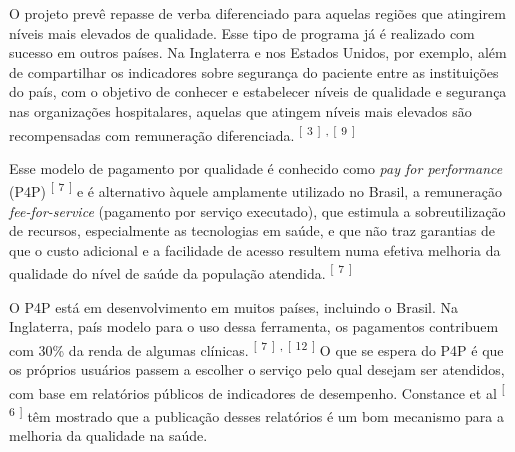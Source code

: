 \documentclass{article}
\begin{document}
O projeto prevê repasse de verba diferenciado para aquelas regiões que atingirem níveis
        mais elevados de qualidade. Esse tipo de programa já é realizado com sucesso em outros
        países. Na Inglaterra e nos Estados Unidos, por exemplo, além de compartilhar os indicadores
        sobre segurança do paciente entre as instituições do país, com o objetivo de conhecer e
        estabelecer níveis de qualidade e segurança nas organizações hospitalares, aquelas que
        atingem níveis mais elevados são recompensadas com remuneração diferenciada. %
\textsuperscript{[}%
\textsuperscript{3}
\textsuperscript{]}  
\textsuperscript{,}
\textsuperscript{[}%
\textsuperscript{9}
\textsuperscript{]}  


Esse modelo de pagamento por qualidade é conhecido como %
\textit{pay for
          performance}
 (P4P) %
\textsuperscript{[}%
\textsuperscript{7}
\textsuperscript{]}  
 e é alternativo àquele amplamente utilizado no Brasil, a remuneração
\textit{fee-for-service}
 (pagamento por serviço executado), que estimula a
        sobreutilização de recursos, especialmente as tecnologias em saúde, e que não traz garantias
        de que o custo adicional e a facilidade de acesso resultem numa efetiva melhoria da
        qualidade do nível de saúde da população atendida. %
\textsuperscript{[}%
\textsuperscript{7}
\textsuperscript{]}  


O P4P está em desenvolvimento em muitos países, incluindo o Brasil. Na Inglaterra, país
        modelo para o uso dessa ferramenta, os pagamentos contribuem com 30\% da renda de algumas
        clínicas. %
\textsuperscript{[}%
\textsuperscript{7}
\textsuperscript{]}  
\textsuperscript{,}
\textsuperscript{[}%
\textsuperscript{12}
\textsuperscript{]}  
 O que se espera do P4P é que os próprios usuários passem a escolher o serviço pelo
        qual desejam ser atendidos, com base em relatórios públicos de indicadores de desempenho.
        Constance et al %
\textsuperscript{[}%
\textsuperscript{6}
\textsuperscript{]}  
 têm mostrado que a publicação desses relatórios é um bom mecanismo para a melhoria
        da qualidade na saúde.
\end{document}
